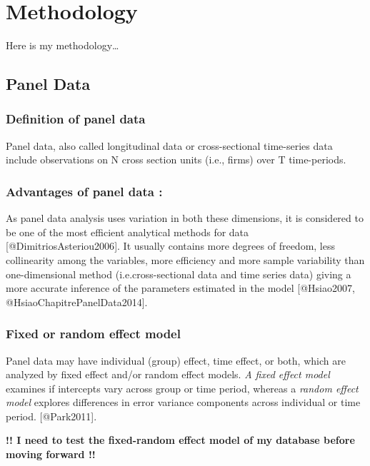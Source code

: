 \documentclass[]{article}
\title{}
\author{}
\date{}
\begin{document}
\section{Methodology}\label{methodology}

Here is my methodology\ldots{}

\subsection{Panel Data}\label{panel-data}

\subsubsection{Definition of panel data}\label{definition-of-panel-data}

Panel data, also called longitudinal data or cross-sectional time-series
data include observations on N cross section units (i.e., firms) over T
time-periods.

\subsubsection{Advantages of panel data
:}\label{advantages-of-panel-data}

As panel data analysis uses variation in both these dimensions, it is
considered to be one of the most efficient analytical methods for data
{[}@DimitriosAsteriou2006{]}. It usually contains more degrees of
freedom, less collinearity among the variables, more efficiency and more
sample variability than one-dimensional method (i.e.cross-sectional data
and time series data) giving a more accurate inference of the parameters
estimated in the model {[}@Hsiao2007, @HsiaoChapitrePanelData2014{]}.

\subsubsection{Fixed or random effect
model}\label{fixed-or-random-effect-model}

Panel data may have individual (group) effect, time effect, or both,
which are analyzed by fixed effect and/or random effect models. \emph{A
fixed effect model} examines if intercepts vary across group or time
period, whereas a \emph{random effect model} explores differences in
error variance components across individual or time period.
{[}@Park2011{]}.

\textbf{!! I need to test the fixed-random effect model of my database
before moving forward !!}
\end{document}
